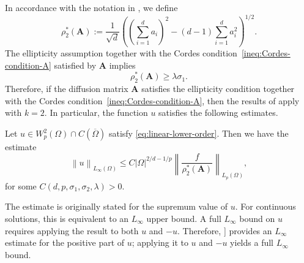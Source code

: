 \documentclass[final,onefignum,onetabnum]{mousaviart}
\begin{document}
	In accordance with the notation in \cite{kuo2007new}, we define
	\begin{equation}
		\label{eq:def-rho-2-ast}
		\rho_2^{\ast}(\boldsymbol{A})
		:=
		\frac{1}{\sqrt{d}}
		\left(
		\left(\sum_{i=1}^{d} a_i\right)^2
		-
		(d-1)\sum_{i=1}^{d} a_i^2
		\right)^{1/2}.
	\end{equation} 
	The ellipticity assumption together with the Cordes condition~\eqref{ineq:Cordes-condition-A} satisfied by $\boldsymbol{A}$ implies
	\begin{equation}
		\label{ineq:lower-bound-rho-2}
		\rho_2^{\ast}(\boldsymbol{A}) \geq \lambda \sigma_1.
	\end{equation}
	Therefore, if the diffusion matrix \(\boldsymbol{A}\) satisfies the ellipticity condition together with the Cordes condition~\eqref{ineq:Cordes-condition-A}, then the results of \cite{kuo2007new} apply with \(k=2\). In particular, the function \(u\) satisfies the following estimates.
	\begin{lemma}
		\label{corollary:ABP-estimate-paper}
		Let $u \in W^2_p(\Omega) \cap C(\overline{\Omega})$ satisfy \eqref{eq:linear-lower-order}. Then
		we have the estimate 
		\begin{equation}
			\label{ineq:ABP-estimate-paper}
			\left\|  u \right\|_{L_{\infty}(\Omega)}  
			\leq
			C \left| \Omega \right|^{2/d - 1/p} \left\| \dfrac{f}{\rho_2^{\ast}(\boldsymbol{A})} \right\|_{L_p(\Omega)} , 
		\end{equation}
		for some $C(d, p, \sigma_1, \sigma_2, \lambda) >0$.
	\end{lemma}
	\begin{remark}
		The estimate is originally stated for the supremum value of $u$. For continuous solutions, this is equivalent to an $L_{\infty}$ upper bound. A full $L_{\infty}$ bound on $u$ requires applying the result to both $u$ and $-u$. Therefore, {\cite[Corollary~4.2]{kuo2007new}}] provides an $L_{\infty}$ estimate for the positive part of $u$; applying it to $u$ and $-u$ yields a full $L_{\infty}$ bound.
	\end{remark}
\end{document}

